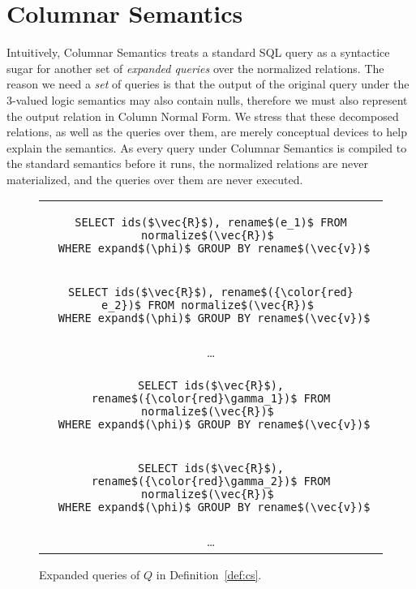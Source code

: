 \documentclass[sigconf,nonacm]{acmart}
\begin{document}
\section{Columnar Semantics}
\label{sec:cs}

Intuitively, Columnar Semantics treats a standard SQL query 
 as a syntactice sugar for another set of {\em expanded queries}
 over the normalized relations.
The reason we need a {\em set} of queries is that
 the output of the original query under the 3-valued logic semantics may 
 also contain nulls, 
 therefore we must also represent the output relation in Column Normal Form. 
We stress that these decomposed relations,
 as well as the queries over them,
 are merely conceptual devices to help explain the semantics.
As every query under Columnar Semantics 
 is compiled to the standard semantics before it runs,
 the normalized relations are never materialized,
 and the queries over them are never executed.

\begin{figure}
\centering
\begin{tabular}{c}
\begin{lstlisting}
SELECT ids($\vec{R}$), rename$(e_1)$ FROM normalize$(\vec{R})$ 
 WHERE expand$(\phi)$ GROUP BY rename$(\vec{v})$
\end{lstlisting}\\
\begin{lstlisting}[basicstyle=\color{black!40}\ttfamily\small]
SELECT ids($\vec{R}$), rename$({\color{red} e_2})$ FROM normalize$(\vec{R})$ 
 WHERE expand$(\phi)$ GROUP BY rename$(\vec{v})$
\end{lstlisting}\\
\dots\\
\begin{lstlisting}[basicstyle=\color{black!40}\ttfamily\small]
SELECT ids($\vec{R}$), rename$({\color{red}\gamma_1})$ FROM normalize$(\vec{R})$ 
 WHERE expand$(\phi)$ GROUP BY rename$(\vec{v})$
\end{lstlisting}\\
\begin{lstlisting}[basicstyle=\color{black!40}\ttfamily\small]
SELECT ids($\vec{R}$), rename$({\color{red}\gamma_2})$ FROM normalize$(\vec{R})$ 
 WHERE expand$(\phi)$ GROUP BY rename$(\vec{v})$
\end{lstlisting}\\
\dots
\end{tabular}
\caption{Expanded queries of $Q$ in Definition~\ref{def:cs}.}
\label{fig:expanded}
\end{figure}
\end{document}
